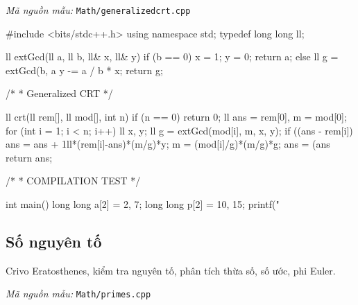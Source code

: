 \documentclass[11pt]{article}
\newcommand{\codepath}[1]{\par\noindent\textit{Mã nguồn mẫu:} \texttt{#1}\par}
\begin{document}
\codepath{Math/generalizedcrt.cpp}

\begingroup\scriptsize
\begin{vncode}
#include <bits/stdc++.h>
using namespace std;
typedef long long ll;

ll extGcd(ll a, ll b, ll& x, ll& y) {
    if (b == 0) {
        x = 1; y = 0;
        return a;
    }
    else {
        ll g = extGcd(b, a %
        y -= a / b * x;
        return g;
    }
}

/*
 * Generalized CRT
 */

ll crt(ll rem[], ll mod[], int n) {
	if (n == 0) return 0;
    ll ans = rem[0], m = mod[0];
    for (int i = 1; i < n; i++) {
	    ll x, y;
	    ll g = extGcd(mod[i], m, x, y);
	    if ((ans - rem[i])%
	    ans = ans + 1ll*(rem[i]-ans)*(m/g)*y;
	    m = (mod[i]/g)*(m/g)*g;
	    ans = (ans%
    }
    return ans;
}

/*
 * COMPILATION TEST
 */

int main() {
	long long a[2] = {2, 7};
	long long p[2] = {10, 15};
	printf("%
}
\end{vncode}
\endgroup


\subsection{Số nguyên tố}

Crivo Eratosthenes, kiểm tra nguyên tố, phân tích thừa số, số ước, phi Euler.

\codepath{Math/primes.cpp}
\end{document}
